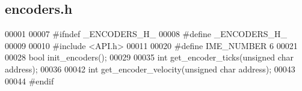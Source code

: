 \subsection{encoders.\+h}
\label{encoders_8h_source}

\begin{DoxyCode}
00001 
00007 \textcolor{preprocessor}{#ifndef \_ENCODERS\_H\_}
00008 \textcolor{preprocessor}{#define \_ENCODERS\_H\_}
00009 
00010 \textcolor{preprocessor}{#include <API.h>}
00011 
00020 \textcolor{preprocessor}{#define IME\_NUMBER 6}
00021 
00028 \textcolor{keywordtype}{bool} init_encoders();
00029 
00035 \textcolor{keywordtype}{int} get_encoder_ticks(\textcolor{keywordtype}{unsigned} \textcolor{keywordtype}{char} address);
00036 
00042 \textcolor{keywordtype}{int} get_encoder_velocity(\textcolor{keywordtype}{unsigned} \textcolor{keywordtype}{char} address);
00043 
00044 \textcolor{preprocessor}{#endif}
\end{DoxyCode}

